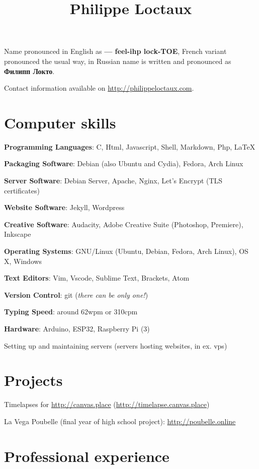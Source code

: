 \documentclass[a4paper]{article}
\title{Philippe Loctaux}
\date{\vspace{-5ex}}
\begin{document}
\maketitle

Name pronounced in English as \textbf{ — feel-ihp lock-TOE}, French variant pronounced the usual way, in Russian name is written and pronounced as \textbf{Филипп Локто}.

Contact information available on \url{http://philippeloctaux.com}.

\section*{Computer skills}

\textbf{Programming Languages}: C, Html, Javascript, Shell, Markdown, Php, \LaTeX

\textbf{Packaging Software}: Debian (also Ubuntu and Cydia), Fedora, Arch Linux

\textbf{Server Software}: Debian Server, Apache, Nginx, Let's Encrypt (TLS certificates)

\textbf{Website Software}: Jekyll, Wordpress

\textbf{Creative Software}: Audacity, Adobe Creative Suite (Photoshop, Premiere), Inkscape

\textbf{Operating Systems}: GNU/Linux (Ubuntu, Debian, Fedora, Arch Linux), OS X, Windows

\textbf{Text Editors}: Vim, Vscode, Sublime Text, Brackets, Atom

\textbf{Version Control}: git (\textit{there can be only one!})

\textbf{Typing Speed}: around 62wpm or 310cpm

\textbf{Hardware}: Arduino, ESP32, Raspberry Pi (3)

Setting up and maintaining servers (servers hosting websites, in ex. vps)

\section*{Projects}

Timelapses for \url{http://canvas.place} (\url{http://timelapse.canvas.place})

La Vega Poubelle (final year of high school project): \url{http://poubelle.online}

\section*{Professional experience}
\end{document}
